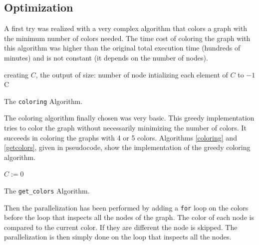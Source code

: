 \documentclass[fleqn,11pt]{SelfArx} %
\theoremstyle{definition}
\begin{document}
\subsection{Optimization}

A first try was realized with a very complex algorithm that colors a graph with the minimum number of colors needed. The time cost of coloring the graph with this algorithm was higher than the original total execution time (hundreds of minutes) and is not constant (it depends on the number of nodes).

\begin{algorithm}[!h]

\BlankLine

creating $C$, the output of size: number of node\;
intializing each element of $C$ to $-1$\;
\Return C\;

\caption{The \texttt{coloring} Algorithm.}
\label{coloring}
\end{algorithm}

The coloring algorithm finally chosen was very basic. This greedy implementation tries to color the graph without necessarily minimizing the number of colors. It succeeds in coloring the graphs with 4 or 5 colors. Algorithms \ref{coloring} and \ref{getcolors}, given in pseudocode, show the implementation of the greedy coloring algorithm.

\begin{algorithm}[h]
\SetAlgoLined
{}

\BlankLine

$C := 0$\;

\caption{The \texttt{get\_colors} Algorithm.}
\label{getcolors}
\end{algorithm}

Then the parallelization has been performed by adding a \verb+for+ loop on the colors before the loop that inspects all the nodes of the graph. The color of each node is compared to the current color. If they are different the node is skipped. The parallelization is then simply done on the loop that inspects all the nodes.
\end{document}
